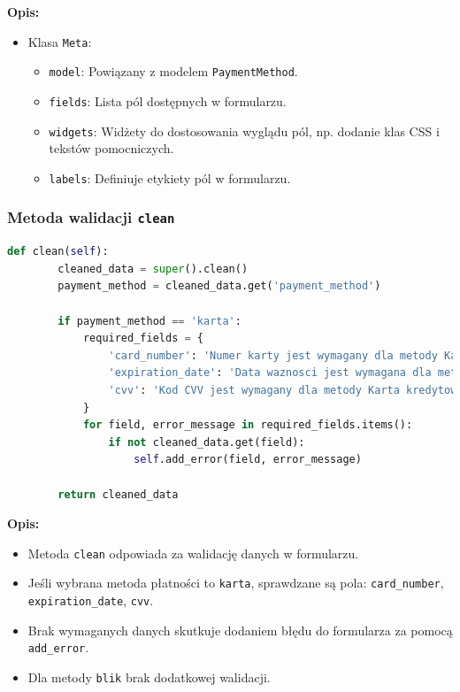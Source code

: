 \documentclass[12pt,a4paper,oneside]{article}
\theoremstyle{definition}
\numberwithin{equation}{section}
\begin{document}
\textbf{Opis:}
\begin{itemize}
    \item Klasa \texttt{Meta}:
    \begin{itemize}
        \item \texttt{model}: Powiązany z modelem \texttt{PaymentMethod}.
        \item \texttt{fields}: Lista pól dostępnych w formularzu.
        \item \texttt{widgets}: Widżety do dostosowania wyglądu pól, np. dodanie klas CSS i tekstów pomocniczych.
        \item \texttt{labels}: Definiuje etykiety pól w formularzu.
    \end{itemize}
\end{itemize}



\subsubsection*{Metoda walidacji \texttt{clean}}
\begin{lstlisting}[language=Python, caption=Metoda walidacji \texttt{clean} w \texttt{PaymentMethod}]
    def clean(self):
        cleaned_data = super().clean()
        payment_method = cleaned_data.get('payment_method')

        if payment_method == 'karta':
            required_fields = {
                'card_number': 'Numer karty jest wymagany dla metody Karta kredytowa/debetowa.',
                'expiration_date': 'Data waznosci jest wymagana dla metody Karta kredytowa/debetowa.',
                'cvv': 'Kod CVV jest wymagany dla metody Karta kredytowa/debetowa.',
            }
            for field, error_message in required_fields.items():
                if not cleaned_data.get(field):
                    self.add_error(field, error_message)

        return cleaned_data
\end{lstlisting}

\textbf{Opis:}
\begin{itemize}
    \item Metoda \texttt{clean} odpowiada za walidację danych w formularzu.
    \item Jeśli wybrana metoda płatności to \texttt{karta}, sprawdzane są pola: \texttt{card\_number}, \texttt{expiration\_date}, \texttt{cvv}.
    \item Brak wymaganych danych skutkuje dodaniem błędu do formularza za pomocą \texttt{add\_error}.
    \item Dla metody \texttt{blik} brak dodatkowej walidacji.
\end{itemize}
\end{document}
